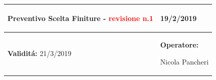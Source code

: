 \documentclass[a4paper]{article}
\begin{document}
                            \begin{center}
                            \begin{tabular}{|L{89mm} R{60mm}| }
                            \hline
                            \vspace{2.5mm}
                            \begin{spacing}{0}
                          \textbf{Preventivo Scelta Finiture - } \textcolor{red}{revisione n.1}
                            \end{spacing}&
                            \vspace{2.5mm}
                            \begin{spacing}{0}
    
                          19/2/2019
    
                            \end{spacing}\\
                            \hline
                            \vspace{2.5mm}
                            \begin{spacing}{0}
                              \textbf{Validit\'a:}
                         21/3/2019
                            \end{spacing} &
                            \vspace{2.5mm}
                            \begin{spacing}{0}
                              \textbf{Operatore:}
    
                         Nicola Pancheri
                            \end{spacing} \\
                            \hline
                            \end{tabular}
                            \end{center}
                         
\end{document}
